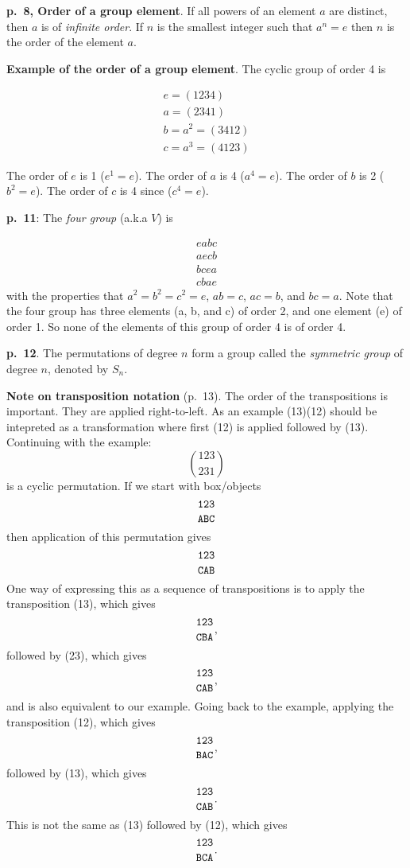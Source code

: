 {\bf p.\ 8, Order of a group element}. If all powers of an element $a$
are distinct, then $a$ is of {\it infinite order}. If $n$ is the
smallest integer such that $a^n = e$ then $n$ is the order of the
element $a$.

{\bf Example of the order of a group element}. The cyclic group of order 4 is

\begin{equation*}
\begin{split}
e = (1234) \\
a = (2341) \\
b = a^2 = (3412) \\
c = a^3 = (4123)
\end{split}
\end{equation*}

The order of $e$ is 1 ($e^1 = e$). The order of $a$ is 4 ($a^4 = e$). The order of $b$ is 2 ($b^2 = e$). The order of $c$ is 4 since ($c^4 = e$).

{\bf p.\ 11}: The {\it four group} (a.k.a $V$) is

\begin{equation}
\begin{split}
  eabc \\
  aecb \\
  bcea \\
  cbae
\end{split}
\end{equation}
with the properties that $a^2 = b^2 = c^2 = e$, $ab = c$, $ac = b$,
and $bc = a$. Note that the four group has three elements (a, b, and
c) of order 2, and one element (e) of order 1. So none of the elements
of this group of order 4 is of order 4.

{\bf p.\ 12}. The permutations of degree $n$ form a group called the
{\it symmetric group} of degree $n$, denoted by $S_n$.

{\bf Note on transposition notation} (p.\ 13). The order of the
transpositions is important. They are applied right-to-left. As an example
(13)(12) should be intepreted as a transformation where
first (12) is applied followed by (13). Continuing with the example:
$$
\genfrac(){0pt}0{123}{231}
$$
is a cyclic permutation. If we start with box/objects
$$
\genfrac{}{}{0pt}0{\tt 123}{\tt ABC}
$$
then application of this permutation gives
$$
\genfrac{}{}{0pt}0{\tt 123}{\tt CAB}
$$
One way of expressing this as a sequence of transpositions is to apply the
transposition (13), which gives
$$
\genfrac{}{}{0pt}0{\tt 123}{\tt CBA},
$$
followed by (23), which gives
$$
\genfrac{}{}{0pt}0{\tt 123}{\tt CAB},
$$
and is also equivalent to our example. Going back to the example, applying the
transposition (12), which gives
$$
\genfrac{}{}{0pt}0{\tt 123}{\tt BAC},
$$
followed by (13), which gives
$$
\genfrac{}{}{0pt}0{\tt 123}{\tt CAB}.
$$
This is not the same as (13) followed by (12), which gives
$$
\genfrac{}{}{0pt}0{\tt 123}{\tt BCA}.
$$

